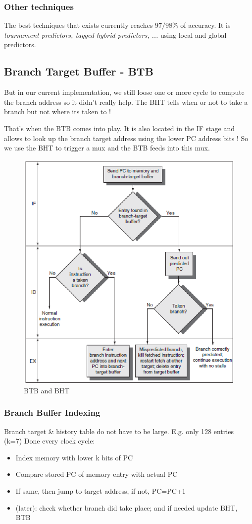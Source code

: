 \documentclass{report}
\begin{document}
\subsubsection{Other techniques}

The best techniques that exists currently reaches $97/98 \%$ of accuracy. It is \textit{tournament predictors, tagged hybrid predictors, ...} using local and global predictors.

\subsection{Branch Target Buffer - BTB}

But in our current implementation, we still loose one or more cycle to compute the branch address so it didn't really help. The BHT tells when or not to take a branch but not where  its taken to !

That's when the BTB comes into play. It is also located in the IF stage and allows to look up the branch target address using the lower PC address bits ! So we use the BHT to trigger a mux and the BTB feeds into this mux.

\begin{figure}[H]
    \centering
    \includegraphics[width=0.5\linewidth]{BTB-BHT.png}
    \caption{BTB and BHT}
    \label{fig:enter-label}
\end{figure}

\subsubsection{Branch Buffer Indexing}

Branch target \& history table do not have to be large. E.g. only 128 entries (k=7) Done every clock cycle:

\begin{itemize}
    \item Index memory with lower k bits of PC
    \item Compare stored PC of memory entry with actual PC
    \item If same, then jump to target address, if not, PC=PC+1
    \item (later): check whether branch did take place; and if needed update BHT, BTB
\end{itemize}
\end{document}
